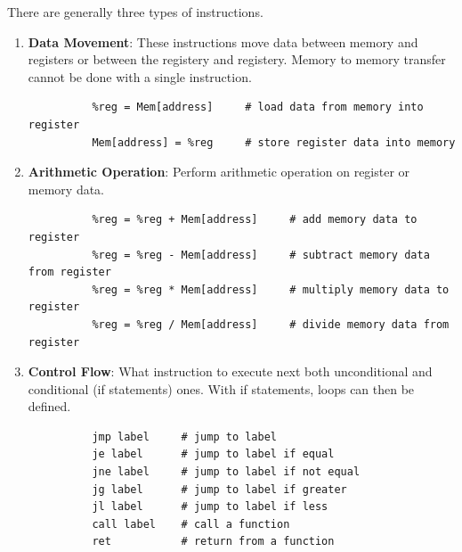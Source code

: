   \begin{definition}
    There are generally three types of instructions. 
    \begin{enumerate} 
      \item \textbf{Data Movement}: These instructions move data between memory and registers or between the registery and registery. Memory to memory transfer cannot be done with a single instruction. 
        \begin{lstlisting} 
          %reg = Mem[address]     # load data from memory into register
          Mem[address] = %reg     # store register data into memory
        \end{lstlisting}
      \item \textbf{Arithmetic Operation}: Perform arithmetic operation on register or memory data. 
        \begin{lstlisting} 
          %reg = %reg + Mem[address]     # add memory data to register
          %reg = %reg - Mem[address]     # subtract memory data from register
          %reg = %reg * Mem[address]     # multiply memory data to register
          %reg = %reg / Mem[address]     # divide memory data from register
        \end{lstlisting}
      \item \textbf{Control Flow}: What instruction to execute next both unconditional and conditional (if statements) ones. With if statements, loops can then be defined. 
        \begin{lstlisting} 
          jmp label     # jump to label
          je label      # jump to label if equal
          jne label     # jump to label if not equal
          jg label      # jump to label if greater
          jl label      # jump to label if less
          call label    # call a function
          ret           # return from a function
        \end{lstlisting}
    \end{enumerate}
  \end{definition}

